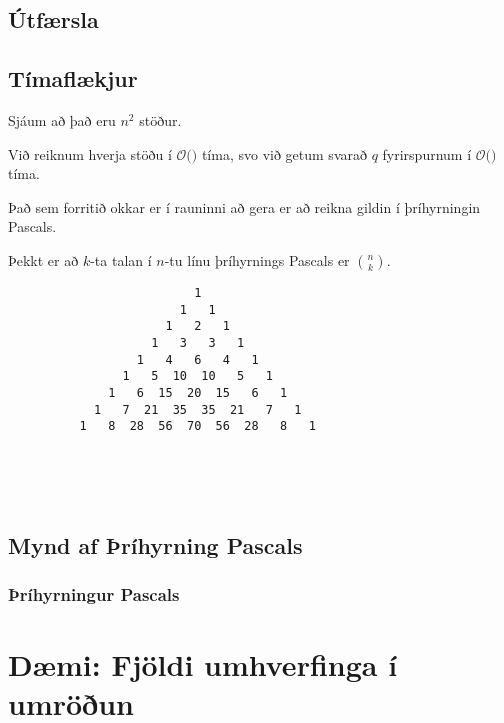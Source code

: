 \subsection{Útfærsla}
{
}

\subsection{Tímaflækjur}
{
    {
        \item<1-> Sjáum að það eru $n^2$ stöður.
        \item<2-> Við reiknum hverja stöðu í $\mathcal{O}($$)$ tíma, svo við getum svarað $q$ fyrirspurnum í
                    $\mathcal{O}($$)$ tíma.
        \item<5-> Það sem forritið okkar er í rauninni að gera er að reikna gildin í þríhyrningin Pascals.
        \item<6-> Þekkt er að $k$-ta talan í $n$-tu línu þríhyrnings Pascals er ${n \choose k}$.
    }
}

{ \begin{verbatim}
                          1
                        1   1
                      1   2   1
                    1   3   3   1
                  1   4   6   4   1
                1   5  10  10   5   1
              1   6  15  20  15   6   1
            1   7  21  35  35  21   7   1
          1   8  28  56  70  56  28   8   1





\end{verbatim}}
\subsection{Mynd af Þríhyrning Pascals}
{
    \frametitle{Þríhyrningur Pascals}
    \pascal
}

\section{Dæmi: Fjöldi umhverfinga í umröðun}
